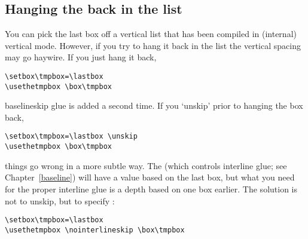\documentclass{book}
\begin{document}
\subsection{Hanging the  back in the list}

You can pick the last box off a vertical list that has been
compiled in (internal) vertical mode.
However, if you try to hang it back in the list the vertical
spacing may go haywire. If you just hang it back,
\begin{verbatim}
\setbox\tmpbox=\lastbox
\usethetmpbox \box\tmpbox
\end{verbatim}
baselineskip glue is added a second time. If you `unskip' prior
to hanging the box back,
\begin{verbatim}
\setbox\tmpbox=\lastbox \unskip
\usethetmpbox \box\tmpbox
\end{verbatim}
things go wrong in a more subtle way.
The  
(which controls interline glue; see Chapter~\ref{baseline})
will have a
value based on the last box, but what you need for the proper
interline glue is a depth based on one box earlier.
The solution is not to unskip,
but to specify :
\begin{verbatim}
\setbox\tmpbox=\lastbox
\usethetmpbox \nointerlineskip \box\tmpbox
\end{verbatim}
\end{document}
